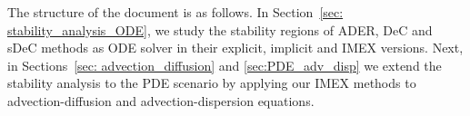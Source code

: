 The structure of the document is as follows.
In Section~\ref{sec: stability_analysis_ODE}, we study the stability regions of ADER, DeC and sDeC methods as ODE solver in their explicit, implicit and IMEX versions.
Next, in Sections~\ref{sec: advection_diffusion} and \ref{sec:PDE_adv_disp} we extend the stability analysis to the PDE scenario by applying our IMEX methods to advection-diffusion and advection-dispersion equations. 

